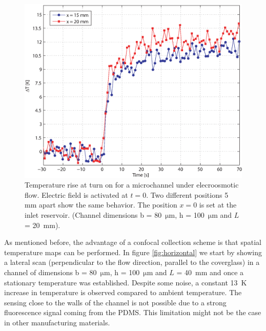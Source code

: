 \documentclass[twocolumn]{svjour3}       %
\begin{document}
\begin{figure}[h!]
\centering
\includegraphics[width=\columnwidth]{figs/temporal.eps}
\caption{Temperature rise at turn on for a microchannel under elecroosmotic flow. Electric field is activated at $t=0$. Two different positions 5 mm apart show the same behavior. The position $x=0$ is set at the inlet reservoir. (Channel dimensions  b = 80~$\mathrm{\mu m}$, h = 100~$\mathrm{\mu m}$ and $L$ = 20~mm).\label{fig:temporal}}
\end{figure}

As mentioned before, the advantage of a confocal collection scheme is that spatial temperature maps can be performed. In figure \ref{fig:horizontal} we start by showing a lateral scan (perpendicular to the flow direction, parallel to the coverglass) in a channel of dimensions b = 80~$\mathrm{\mu m}$, h = 100~$\mathrm{\mu m}$ and $L$ = 40~mm and once a stationary temperature was established. Despite some noise, a constant 13~K increase in temperature is observed compared to ambient temperature. The sensing close to the walls of the channel is not possible due to a strong fluorescence signal coming from the PDMS. This limitation might not be the case in other manufacturing materials.
\end{document}
